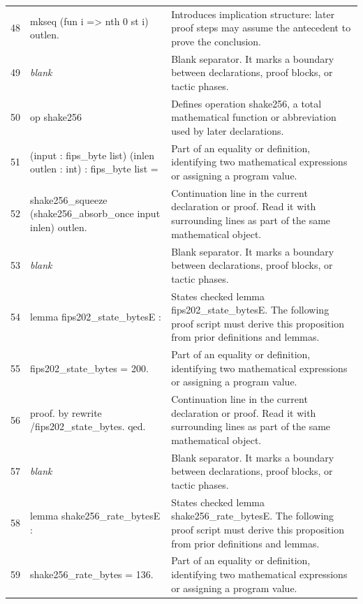 \documentclass[10pt]{article}
\begin{document}
\begin{longtable}{r L{0.53\textwidth} L{0.37\textwidth}}
48 & {\ttfamily\scriptsize   mkseq (fun i => nth 0 st i) outlen.} & Introduces implication structure: later proof steps may assume the antecedent to prove the conclusion. \\
49 & {\ttfamily\scriptsize \emph{blank}} & Blank separator.  It marks a boundary between declarations, proof blocks, or tactic phases. \\
50 & {\ttfamily\scriptsize op shake256} & Defines operation shake256, a total mathematical function or abbreviation used by later declarations. \\
51 & {\ttfamily\scriptsize    (input : fips\_byte list) (inlen outlen : int) : fips\_byte list =} & Part of an equality or definition, identifying two mathematical expressions or assigning a program value. \\
52 & {\ttfamily\scriptsize   shake256\_squeeze (shake256\_absorb\_once input inlen) outlen.} & Continuation line in the current declaration or proof.  Read it with surrounding lines as part of the same mathematical object. \\
53 & {\ttfamily\scriptsize \emph{blank}} & Blank separator.  It marks a boundary between declarations, proof blocks, or tactic phases. \\
54 & {\ttfamily\scriptsize lemma fips202\_state\_bytesE :} & States checked lemma fips202\_state\_bytesE.  The following proof script must derive this proposition from prior definitions and lemmas. \\
55 & {\ttfamily\scriptsize   fips202\_state\_bytes = 200.} & Part of an equality or definition, identifying two mathematical expressions or assigning a program value. \\
56 & {\ttfamily\scriptsize proof. by rewrite /fips202\_state\_bytes. qed.} & Continuation line in the current declaration or proof.  Read it with surrounding lines as part of the same mathematical object. \\
57 & {\ttfamily\scriptsize \emph{blank}} & Blank separator.  It marks a boundary between declarations, proof blocks, or tactic phases. \\
58 & {\ttfamily\scriptsize lemma shake256\_rate\_bytesE :} & States checked lemma shake256\_rate\_bytesE.  The following proof script must derive this proposition from prior definitions and lemmas. \\
59 & {\ttfamily\scriptsize   shake256\_rate\_bytes = 136.} & Part of an equality or definition, identifying two mathematical expressions or assigning a program value. \\

\end{longtable}
\end{document}
